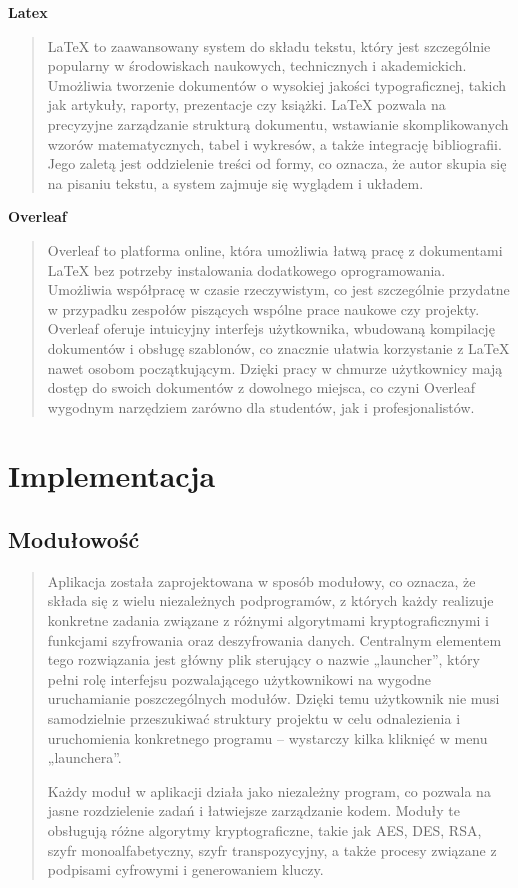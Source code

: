\documentclass[12pt,a4paper]{article}
\begin{document}
\noindent\textbf{Latex}
\begin{quotation} \noindent LaTeX to zaawansowany system do składu tekstu, który jest szczególnie popularny w środowiskach naukowych, technicznych i akademickich. Umożliwia tworzenie dokumentów o wysokiej jakości typograficznej, takich jak artykuły, raporty, prezentacje czy książki. LaTeX pozwala na precyzyjne zarządzanie strukturą dokumentu, wstawianie skomplikowanych wzorów matematycznych, tabel i wykresów, a także integrację bibliografii. Jego zaletą jest oddzielenie treści od formy, co oznacza, że autor skupia się na pisaniu tekstu, a system zajmuje się wyglądem i układem.
\end{quotation}

\noindent\textbf{Overleaf}
\begin{quotation} \noindent Overleaf to platforma online, która umożliwia łatwą pracę z dokumentami LaTeX bez potrzeby instalowania dodatkowego oprogramowania. Umożliwia współpracę w czasie rzeczywistym, co jest szczególnie przydatne w przypadku zespołów piszących wspólne prace naukowe czy projekty. Overleaf oferuje intuicyjny interfejs użytkownika, wbudowaną kompilację dokumentów i obsługę szablonów, co znacznie ułatwia korzystanie z LaTeX nawet osobom początkującym. Dzięki pracy w chmurze użytkownicy mają dostęp do swoich dokumentów z dowolnego miejsca, co czyni Overleaf wygodnym narzędziem zarówno dla studentów, jak i profesjonalistów.
\end{quotation}



\newpage
\section{Implementacja}
\subsection{Modułowość}
\begin{quotation} \noindent Aplikacja została zaprojektowana w sposób modułowy, co oznacza, że składa się z wielu niezależnych podprogramów, z których każdy realizuje konkretne zadania związane z różnymi algorytmami kryptograficznymi i funkcjami szyfrowania oraz deszyfrowania danych. Centralnym elementem tego rozwiązania jest główny plik sterujący o nazwie „launcher”, który pełni rolę interfejsu pozwalającego użytkownikowi na wygodne uruchamianie poszczególnych modułów. Dzięki temu użytkownik nie musi samodzielnie przeszukiwać struktury projektu w celu odnalezienia i uruchomienia konkretnego programu – wystarczy kilka kliknięć w menu „launchera”.\newline

\noindent Każdy moduł w aplikacji działa jako niezależny program, co pozwala na jasne rozdzielenie zadań i łatwiejsze zarządzanie kodem. Moduły te obsługują różne algorytmy kryptograficzne, takie jak AES, DES, RSA, szyfr monoalfabetyczny, szyfr transpozycyjny, a także procesy związane z podpisami cyfrowymi i generowaniem kluczy.
\end{quotation}
\end{document}
